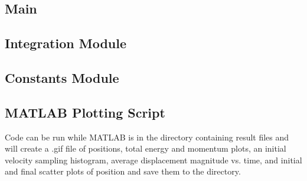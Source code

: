 \documentclass[12pt]{article}
\begin{document}
\subsection*{Main}

\subsection*{Integration Module}

\subsection*{Constants Module}

\subsection*{MATLAB Plotting Script}
Code can be run while MATLAB is in the directory containing result files and will create a .gif file of positions, total energy and momentum plots, an initial velocity sampling histogram, average displacement magnitude vs. time, and initial and final scatter plots of position and save them to the directory.

\end{document}
